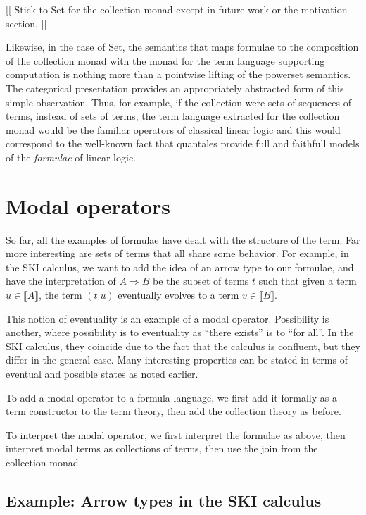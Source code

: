 \documentclass{llncs}
\newcommand{\interp}[1]{\llbracket #1 \rrbracket}
\newcommand{\Set}{\mathrm{Set}}
\begin{document}
[[ Stick to Set for the collection monad except in future work or the motivation section. ]]

  Likewise, in the case of
$\Set$, the semantics that maps formulae to the composition of the
collection monad with the monad for the term language supporting
computation is nothing more than a pointwise lifting of the powerset
semantics.  The categorical presentation provides an appropriately
abstracted form of this simple observation.  Thus, for example, if the
collection were sets of sequences of terms, instead of sets of terms,
the term language extracted for the collection monad would be the
familiar operators of classical linear logic and this would correspond
to the well-known fact that quantales provide full and faithfull
models of the \emph{formulae} of linear logic.

\section{Modal operators}

So far, all the examples of formulae have dealt with the structure of the term.  Far more interesting are sets of terms that all share some behavior.  For example, in the SKI calculus, we want to add the idea of an arrow type to our formulae, and have the interpretation of $A \Rightarrow B$ be the subset of terms $t$ such that given a term $u\in\interp{A}$, the term $(t\; u)$ eventually evolves to a term $v\in\interp{B}.$

This notion of eventuality is an example of a modal operator.  Possibility is another, where possibility is to eventuality as ``there exists'' is to ``for all''.  In the SKI calculus, they coincide due to the fact that the calculus is confluent, but they differ in the general case.  Many interesting properties can be stated in terms of eventual and possible states as noted earlier.

To add a modal operator to a formula language, we first add it formally as a term constructor to the term theory, then add the collection theory as before.  

To interpret the modal operator, we first interpret the formulae as above, then interpret modal terms as collections of terms, then use the join from the collection monad.

\subsection{Example: Arrow types in the SKI calculus}
\end{document}
